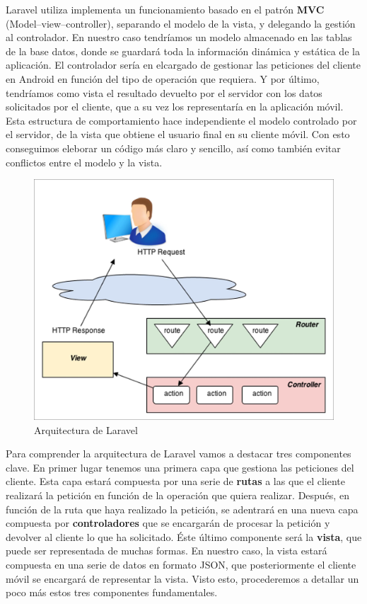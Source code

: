 Laravel utiliza implementa un funcionamiento basado en el patrón \textbf{MVC} (Model–view–controller), separando el modelo de la vista, y delegando la gestión al controlador. En nuestro caso tendríamos un modelo almacenado en las tablas de la base datos, donde se guardará toda la información dinámica y estática de la aplicación. El controlador sería en elcargado de gestionar las peticiones del cliente en Android en función del tipo de operación que requiera. Y por último, tendríamos como vista el resultado devuelto por el servidor con los datos solicitados por el cliente, que a su vez los representaría en la aplicación móvil. Esta estructura de comportamiento hace independiente el modelo controlado por el servidor, de la vista que obtiene el usuario final en su cliente móvil. Con esto conseguimos eleborar un código más claro y sencillo, así como también evitar conflictos entre el modelo y la vista.

\begin{figure}[H]
\centering
\includegraphics[keepaspectratio, scale=0.8]{Media/Captures/laravelArch.jpg}
\caption{Arquitectura de Laravel}
\label{fig:laravelArch}
\end{figure}

Para comprender la arquitectura de Laravel vamos a destacar tres componentes clave. En primer lugar tenemos una primera capa que gestiona las peticiones del cliente. Esta capa estará compuesta por una serie de \textbf{rutas} a las que el cliente realizará la petición en función de la operación que quiera realizar. Después, en función de la ruta que haya realizado la petición, se adentrará en una nueva capa compuesta por \textbf{controladores} que se encargarán de procesar la petición y devolver al cliente lo que ha solicitado. Éste último componente será la \textbf{vista}, que puede ser representada de muchas formas. En nuestro caso, la vista estará compuesta en una serie de datos en formato JSON, que posteriormente el cliente móvil se encargará de representar la vista. Visto esto, procederemos a detallar un poco más estos tres componentes fundamentales.

